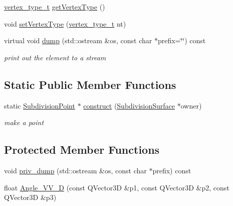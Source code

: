 \begin{DoxyCompactItemize}
\item 
\hyperlink{namespaceShipCAD_a03171cc921c53a568b778f5131a60deb}{vertex\-\_\-type\-\_\-t} \hyperlink{classShipCAD_1_1SubdivisionPoint_a3ccd55795bf99f25b1ad8f937de9670a}{get\-Vertex\-Type} ()
\item 
void \hyperlink{classShipCAD_1_1SubdivisionPoint_a614259dfa2470bbbd7b8cc73039ad501}{set\-Vertex\-Type} (\hyperlink{namespaceShipCAD_a03171cc921c53a568b778f5131a60deb}{vertex\-\_\-type\-\_\-t} nt)
\item 
virtual void \hyperlink{classShipCAD_1_1SubdivisionPoint_aed72cf5e8dc67e980010d195f3a376a3}{dump} (std\-::ostream \&os, const char $\ast$prefix=\char`\"{}\char`\"{}) const 
\begin{DoxyCompactList}\small\item\em print out the element to a stream \end{DoxyCompactList}\end{DoxyCompactItemize}
\subsection*{Static Public Member Functions}
\begin{DoxyCompactItemize}
\item 
static \hyperlink{classShipCAD_1_1SubdivisionPoint}{Subdivision\-Point} $\ast$ \hyperlink{classShipCAD_1_1SubdivisionPoint_a8e907cca747b0483374d4fdde8eb4ad1}{construct} (\hyperlink{classShipCAD_1_1SubdivisionSurface}{Subdivision\-Surface} $\ast$owner)
\begin{DoxyCompactList}\small\item\em make a point \end{DoxyCompactList}\end{DoxyCompactItemize}
\subsection*{Protected Member Functions}
\begin{DoxyCompactItemize}
\item 
void \hyperlink{classShipCAD_1_1SubdivisionPoint_aa2d85a086268f335eefeaef0b48a96a1}{priv\-\_\-dump} (std\-::ostream \&os, const char $\ast$prefix) const 
\item 
float \hyperlink{classShipCAD_1_1SubdivisionPoint_a72061d495903d8265f33bada30a0c416}{Angle\-\_\-\-V\-V\-\_\-D} (const Q\-Vector3\-D \&p1, const Q\-Vector3\-D \&p2, const Q\-Vector3\-D \&p3)
\end{DoxyCompactItemize}
